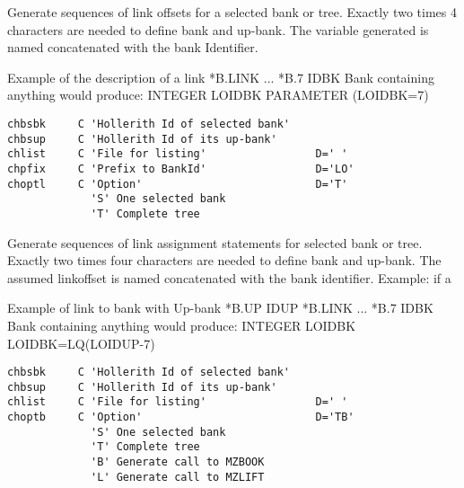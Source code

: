 Generate sequences of link offsets for a selected bank or tree.
Exactly two times 4 characters are needed to define bank and up-bank.
The variable generated is named  concatenated with the
bank Identifier.
 
\begin{XMPt}{Example of the description of a link}
         *B.LINK
         ...
         *B.7 IDBK  Bank containing anything
 {\rm would produce:}
         INTEGER LOIDBK
         PARAMETER (LOIDBK=7)
\end{XMPt}
 
\newpage

 
\begin{verbatim}
chbsbk     C 'Hollerith Id of selected bank'
chbsup     C 'Hollerith Id of its up-bank'
chlist     C 'File for listing'                 D=' '
chpfix     C 'Prefix to BankId'                 D='LO'
choptl     C 'Option'                           D='T'
             'S' One selected bank
             'T' Complete tree
\end{verbatim}
 
Generate sequences of link assignment statements for selected
bank or tree.
Exactly two times four characters are needed to define bank and up-bank.
The assumed linkoffset is named  concatenated with the
bank identifier.
Example: if a 
\par
\begin{XMPt}{Example of link to bank  with Up-bank }
         *B.UP IDUP
         *B.LINK
         ...
         *B.7  IDBK  Bank containing anything
 {\rm would produce:}
         INTEGER LOIDBK
         LOIDBK=LQ(LOIDUP-7)
\end{XMPt}
 
 
\begin{verbatim}
chbsbk     C 'Hollerith Id of selected bank'
chbsup     C 'Hollerith Id of its up-bank'
chlist     C 'File for listing'                 D=' '
choptb     C 'Option'                           D='TB'
             'S' One selected bank
             'T' Complete tree
             'B' Generate call to MZBOOK
             'L' Generate call to MZLIFT
\end{verbatim}
 
